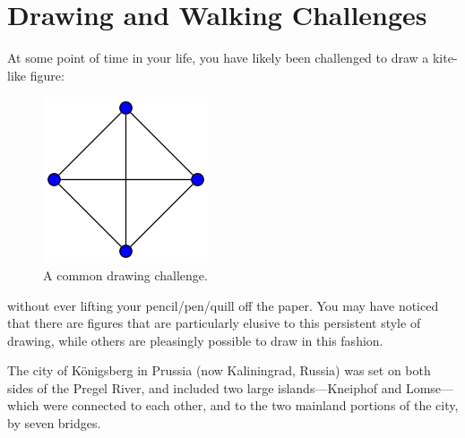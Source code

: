 \documentclass[
  letterpaper,
  DIV=11,
  numbers=noendperiod]{scrreprt}
\begin{document}
\hypertarget{drawing-and-walking-challenges}{%
\section{Drawing and Walking
Challenges}\label{drawing-and-walking-challenges}}

At some point of time in your life, you have likely been challenged to
draw a kite-like figure:

\begin{figure}

{\centering \includegraphics{./figures/draw-K4.png}

}

\caption{A common drawing challenge.}

\end{figure}

without ever lifting your pencil/pen/quill off the paper. You may have
noticed that there are figures that are particularly elusive to this
persistent style of drawing, while others are pleasingly possible to
draw in this fashion.

\begin{tcolorbox}[standard jigsaw,toptitle=1mm, titlerule=0mm, bottomtitle=1mm, title=\textcolor{quarto-callout-warning-color}{\faExclamationTriangle}\hspace{0.5em}{(Spoiler) Beth Thomas demonstrating what drawing challenges are doable}, coltitle=black, colback=white, toprule=.15mm, colframe=quarto-callout-warning-color-frame, arc=.35mm, rightrule=.15mm, opacityback=0, left=2mm, leftrule=.75mm, colbacktitle=quarto-callout-warning-color!10!white, opacitybacktitle=0.6, bottomrule=.15mm]

\end{tcolorbox}

The city of Königsberg in Prussia (now Kaliningrad, Russia) was set on
both sides of the Pregel River, and included two large
islands---Kneiphof and Lomse---which were connected to each other, and
to the two mainland portions of the city, by seven bridges.
\end{document}
